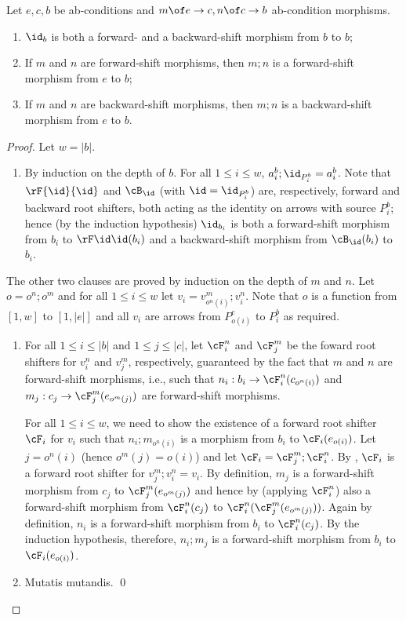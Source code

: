 \begin{lemma}
Let $e,c,b$ be ab-conditions and $m\of e\to c, n\of c\to b$ ab-condition morphisms.
\begin{enumerate}[topsep=\smallskipamount]
\item $\id_b$ is both a forward- and a backward-shift morphism from $b$ to $b$;
\item If $m$ and $n$ are forward-shift morphisms, then $m;n$ is a forward-shift morphism from $e$ to $b$;
\item If $m$ and $n$ are backward-shift morphisms, then $m;n$ is a backward-shift morphism from $e$ to $b$.
\end{enumerate}
\end{lemma}
%
\begin{fullorname}
\begin{proof}
Let $w=|b|$.
%
\begin{enumerate}[topsep=\smallskipamount]
\item By induction on the depth of $b$. For all $1\leq i\leq w$, $a^b_i;\id_{P^b_i}=a^b_i$. Note that $\rF{\id}{\id}$ and $\cB_\id$ (with $\id=\id_{P^b_i}$) are, respectively, forward and backward root shifters, both acting as the identity on arrows with source $P^b_i$; hence (by the induction hypothesis) $\id_{b_i}$ is both a forward-shift morphism from $b_i$ to $\rF\id\id(b_i)$ and a backward-shift morphism from  $\cB_\id(b_i)$ to $b_i$.
\end{enumerate}
%
The other two clauses are proved by induction on the depth of $m$ and $n$. Let $o=o^n;o^m$ and for all $1\leq i\leq w$ let $v_i=v^m_{o^n(i)};v^n_i$. Note that $o$ is a function from $[1,w]$ to $[1,|e|]$ and all $v_i$ are arrows from $P^e_{o(i)}$ to $P^b_i$ as required.
%
\begin{enumerate}[resume]
\item For all $1\leq i\leq |b|$ and $1\leq j\leq |c|$, let $\cF^n_i$ and $\cF^m_j$ be the foward root shifters for $v^n_i$ and $v^m_j$, respectively, guaranteed by the fact that $m$ and $n$ are forward-shift morphisms, i.e., such that $n_i:b_i \to \cF^n_i(c_{o^n(i)})$ and $m_j:c_j \to \cF^m_j(e_{o^m(j)})$ are forward-shift morphisms.

\smallskip
For all $1\leq i\leq w$, we need to show the existence of a forward root shifter $\cF_i$ for $v_i$ such that $n_i;m_{o^n(i)}$ is a morphism from $b_i$ to $\cF_i(e_{o(i)})$. Let $j=o^n(i)$ (hence $o^m(j)=o(i)$) and let $\cF_i=\cF^m_j;\cF^n_i$. By , $\cF_i$ is a forward root shifter for $v^m_j;v^n_i=v_i$. By definition, $m_j$ is a forward-shift morphism from $c_j$ to $\cF^m_j(e_{o^m(j)})$ and hence by  (applying $\cF^n_i$) also a forward-shift morphism from $\cF^n_i(c_j)$ to $\cF^n_i(\cF^m_j(e_{o^m(j)}))$. Again by definition, $n_i$ is a forward-shift morphism from $b_i$ to $\cF^n_i(c_j)$. By the induction hypothesis, therefore, $n_i;m_j$ is a forward-shift morphism from  $b_i$ to $\cF_i(e_{o(i)})$.

\item Mutatis mutandis.
\qed
\end{enumerate}
\end{proof}
\end{fullorname}
